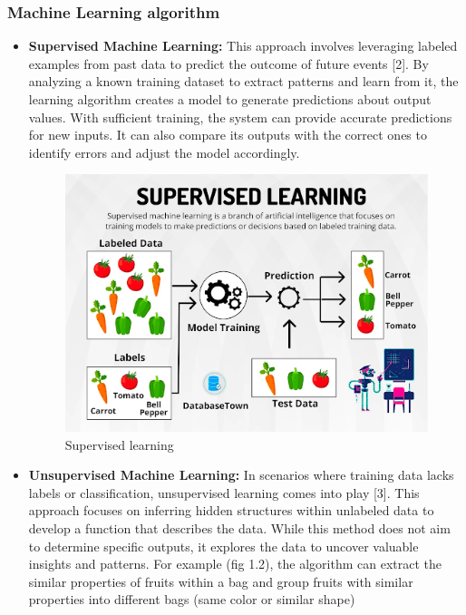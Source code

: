 \subsubsection{Machine Learning algorithm}
\begin{itemize}
\item\textbf{Supervised Machine Learning: }This approach involves leveraging labeled examples from past data to predict the outcome of future events [2]. By analyzing a known training dataset to extract patterns and learn from it, the learning algorithm creates a model to generate predictions about output values. With sufficient training, the system can provide accurate predictions for new inputs. It can also compare its outputs with the correct ones to identify errors and adjust the model accordingly.
\begin{center}
    \begin{figure}[!htp]
        \centering
        \includegraphics[width=0.8 \textwidth]{image/supervised_learning.png}
        \caption{Supervised learning}
        \label{subsection}
    \end{figure}
    \end{center}
\item\textbf{Unsupervised Machine Learning: } In scenarios where training data lacks labels or classification, unsupervised learning comes into play [3]. This approach focuses on inferring hidden structures within unlabeled data to develop a function that describes the data. While this method does not aim to determine specific outputs, it explores the data to uncover valuable insights and patterns.
\newline
For example (fig 1.2), the algorithm can extract the similar properties of fruits within a bag and group fruits with similar properties into different bags (same color or similar shape)


\end{itemize}
